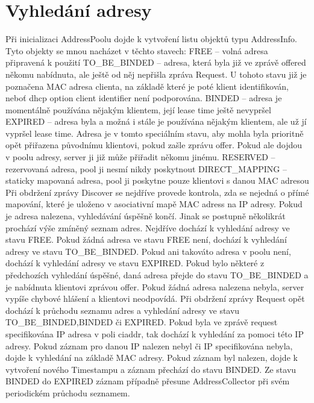 \documentclass[12pt,a4paper]{report}
\begin{document}
\section{Vyhledání adresy}
Při inicializaci AddressPoolu dojde k vytvoření listu objektů typu AddressInfo. Tyto objekty se mnou nacházet v těchto stavech: 
FREE – volná adresa připravená k použití 
TO\_BE\_BINDED – adresa, která byla již ve zprávě offered někomu nabídnuta, ale ještě od něj nepřišla zpráva Request. U tohoto stavu již je poznačena MAC adresa clienta, na základě které je poté klient identifikován, neboť dhcp option client identifier není podporována. 
BINDED – adresa je momentálně používána nějakým klientem, její lease time ještě nevypršel
EXPIRED – adresa byla a možná i stále je používána nějakým klientem, ale už jí vypršel lease time. Adresa je v tomto speciálním stavu, aby mohla byla prioritně opět přiřazena původnímu klientovi, pokud zašle zprávu offer. Pokud ale dojdou v poolu adresy, server ji již může přiřadit někomu jinému.
RESERVED – rezervovaná adresa, pool ji nesmí nikdy poskytnout
DIRECT\_MAPPING – staticky mapovaná adresa, pool ji poskytne pouze klientovi s danou MAC adresou
Při obdržení zprávy Discover se nejdříve provede kontrola, zda se nejedná o přímé mapování, které je uloženo v asociativní mapě MAC adress na IP adresy. Pokud je adresa nalezena, vyhledávání úspěšně končí. Jinak se postupně několikrát prochází výše zmíněný seznam adres. Nejdříve dochází k vyhledání adresy ve stavu FREE. Pokud žádná adresa ve stavu FREE není, dochází k vyhledání adresy ve stavu TO\_BE\_BINDED. Pokud ani takováto adresa v poolu není, dochází k vyhledání adresy ve stavu EXPIRED. Pokud bylo některé z předchozích vyhledání úspěšné, daná adresa přejde do stavu TO\_BE\_BINDED a je nabídnuta klientovi zprávou offer. Pokud žádná adresa nalezena nebyla, server vypíše chybové hlášení a klientovi neodpovídá. 
Při obdržení zprávy Request opět dochází k průchodu seznamu adres a vyhledání adresy ve stavu TO\_BE\_BINDED,BINDED či EXPIRED. Pokud byla ve zprávě request specifikována IP adresa v poli ciaddr, tak dochází k vyhledání za pomoci této IP adresy. Pokud záznam pro danou IP nalezen nebyl či IP specifikována nebyla, dojde k vyhledání na základě MAC adresy. Pokud záznam byl nalezen, dojde k vytvoření nového Timestampu a záznam přechází do stavu BINDED.  Ze stavu BINDED do EXPIRED záznam případně přesune AddressCollector při svém periodickém průchodu seznamem.
\end{document}
